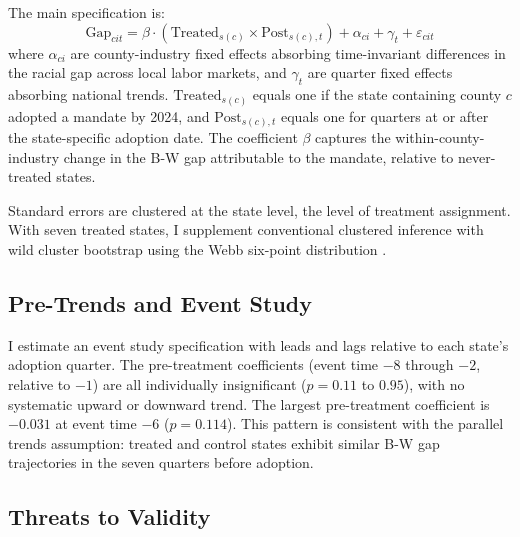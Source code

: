 \documentclass[12pt]{article}
\begin{document}
The main specification is:
\begin{equation}
\text{Gap}_{cit} = \beta \cdot (\text{Treated}_{s(c)} \times \text{Post}_{s(c),t}) + \alpha_{ci} + \gamma_t + \varepsilon_{cit}
\label{eq:did}
\end{equation}
where $\alpha_{ci}$ are county-industry fixed effects absorbing time-invariant differences in the racial gap across local labor markets, and $\gamma_t$ are quarter fixed effects absorbing national trends. $\text{Treated}_{s(c)}$ equals one if the state containing county $c$ adopted a mandate by 2024, and $\text{Post}_{s(c),t}$ equals one for quarters at or after the state-specific adoption date. The coefficient $\beta$ captures the within-county-industry change in the B-W gap attributable to the mandate, relative to never-treated states.

Standard errors are clustered at the state level, the level of treatment assignment. With seven treated states, I supplement conventional clustered inference with wild cluster bootstrap using the Webb six-point distribution \citep{webb2014reworking}.

\subsection{Pre-Trends and Event Study}

I estimate an event study specification with leads and lags relative to each state's adoption quarter. The pre-treatment coefficients (event time $-8$ through $-2$, relative to $-1$) are all individually insignificant ($p = 0.11$ to $0.95$), with no systematic upward or downward trend. The largest pre-treatment coefficient is $-0.031$ at event time $-6$ ($p = 0.114$). This pattern is consistent with the parallel trends assumption: treated and control states exhibit similar B-W gap trajectories in the seven quarters before adoption.

\subsection{Threats to Validity}
\end{document}
